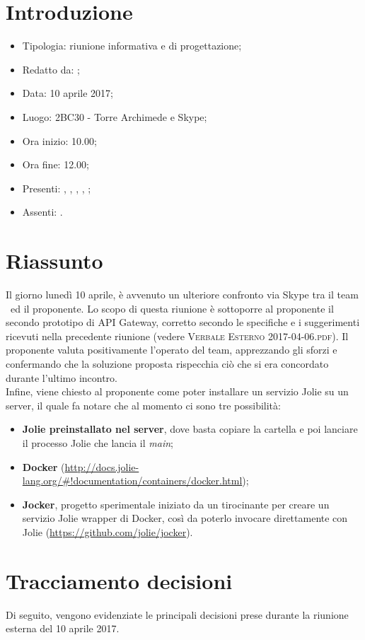 \section{Introduzione}

	\begin{itemize}
		\item Tipologia: riunione informativa e di progettazione;
		\item Redatto da: \MC;
		\item Data: 10 aprile 2017;
		\item Luogo: 2BC30 - Torre Archimede e Skype;
		\item Ora inizio: 10.00;
		\item Ora fine: 12.00;
		\item Presenti: \DAN, \MC, \DS, \AS, \NS;	
		\item Assenti: \AN.
	\end{itemize}

\section{Riassunto}
Il giorno lunedì 10 aprile, è avvenuto un ulteriore confronto via Skype tra il team \gruppo\ ed il proponente.
Lo scopo di questa riunione è sottoporre al proponente il secondo prototipo di API Gateway, corretto secondo le specifiche e i suggerimenti ricevuti nella precedente riunione (vedere \textsc{Verbale Esterno 2017-04-06.pdf}).
Il proponente valuta positivamente l'operato del team, apprezzando gli sforzi e confermando che la soluzione proposta rispecchia ciò che si era concordato durante l'ultimo incontro.\\
Infine, viene chiesto al proponente come poter installare un servizio Jolie su un server, il quale fa notare che al momento ci sono tre possibilità:
\begin{itemize}
	\item \textbf{Jolie preinstallato nel server}, dove basta copiare la cartella	e poi lanciare il processo Jolie che lancia il \textit{main};
	\item \textbf{Docker} (\url{http://docs.jolie-lang.org/#!documentation/containers/docker.html});
	\item \textbf{Jocker}, progetto sperimentale iniziato da un tirocinante per creare un servizio Jolie wrapper di Docker, così da poterlo invocare direttamente con Jolie (\url{https://github.com/jolie/jocker}).
\end{itemize}

\section{Tracciamento decisioni}
Di seguito, vengono evidenziate le principali decisioni prese durante la riunione esterna del 10 aprile 2017.

